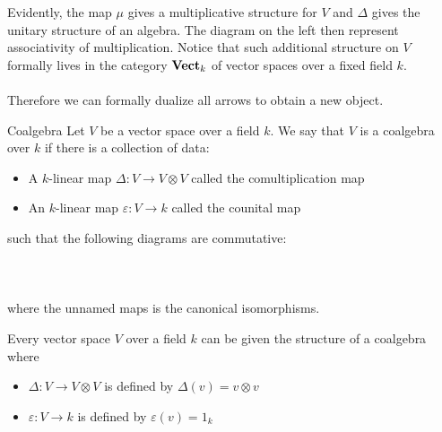 \documentclass[a4paper]{article}
\begin{document}
Evidently, the map $\mu$ gives a multiplicative structure for $V$ and $\Delta$ gives the unitary structure of an algebra. The diagram on the left then represent associativity of multiplication. Notice that such additional structure on $V$ formally lives in the category $\bold{Vect}_k$ of vector spaces over a fixed field $k$. \\~\\

Therefore we can formally dualize all arrows to obtain a new object. 

\begin{defn}{Coalgebra}{} Let $V$ be a vector space over a field $k$. We say that $V$ is a coalgebra over $k$ if there is a collection of data: 
\begin{itemize}
\item A $k$-linear map $\Delta:V\to V\otimes V$ called the comultiplication map
\item An $k$-linear map $\varepsilon:V\to k$ called the counital map
\end{itemize} 
such that the following diagrams are commutative: \\~\\
\\~\\
where the unnamed maps is the canonical isomorphisms. 
\end{defn}

\begin{lmm}{}{} Every vector space $V$ over a field $k$ can be given the structure of a coalgebra where 
\begin{itemize}
\item $\Delta:V\to V\otimes V$ is defined by $\Delta(v)=v\otimes v$
\item $\varepsilon:V\to k$ is defined by $\varepsilon(v)=1_k$
\end{itemize}

\end{lmm}
\end{document}
